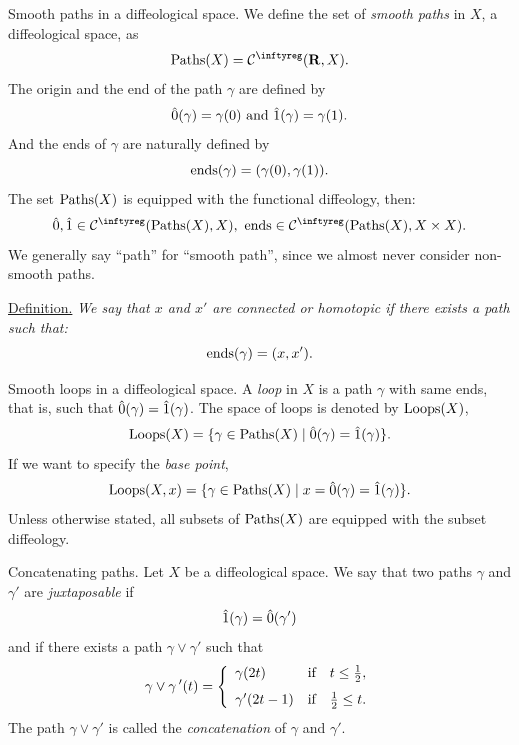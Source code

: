 \begin{Article}{Smooth paths in a diffeological space.}{}
  We define the set of \emph{smooth paths} in $X$,
  a diffeological space,
  as
  $$%
   \Paths(X) = \Cinfty(\RR,X).
  $$%
  The origin and the end of the path $\gamma$ are defined by
  $$%
  \0(\gamma) = \gamma(0)
  \SpacedText{and}
  \1(\gamma) = \gamma(1).
  $$%
  And the ends of $\gamma$ are naturally defined by
  $$%
  \Ends(\gamma) = (\gamma(0),\gamma(1)).
  $$%
  The set $\operatorname{Paths}(X)$ is equipped with the functional diffeology,
  then:
  $$%
  \0, \1 \in \Cinfty(\Paths(X), X),
  \ \Ends \in \Cinfty(\Paths(X), X \times X).
  $$%
  We generally say ``path'' for ``smooth path'',
  since we almost never consider non-smooth paths.

  \uline{Definition.} {\itshape We say that $x$ and $x'$ are \emph{connected} or \emph{homotopic} if there exists a path such that:
  $$%
  \Ends(\gamma) = (x,x').
  $$%
  }
\end{Article}

\begin{Article}{Smooth loops in a diffeological space.}{}
  A \emph{loop} in $X$ is a path $\gamma$ with same ends,
  that is,
  such that $\hat 0(\gamma) = \hat 1(\gamma)$.
  The space of loops is denoted by $\operatorname{Loops}(X)$,
  $$%
  \Loops(X) = \{ \gamma \in \Paths(X) \mid \0(\gamma) = \1(\gamma) \}.
  $$%
  If we want to specify the \emph{base point},
  $$%
  \Loops(X,x) = \{ \gamma \in \Paths(X) \mid x = \0(\gamma) = \1(\gamma) \}.
  $$%
  Unless otherwise stated,
  all subsets of $\operatorname{Paths}(X)$ are equipped with the subset diffeology.
\end{Article}

\begin{Article}{Concatenating paths.}{}
  \label{Concatenation-Paths}
  Let $X$ be a diffeological space.
  We say that two paths $\gamma$ and $\gamma'$ are \emph{juxtaposable} if
  $$%
  \1(\gamma) = \0(\gamma')
  $$%
  and if there exists a path $\gamma \vee \gamma'$ such that
  $$%
  \gamma\vee\gamma\,'(t) =
  \left\{
  \begin{array}{lcl}
    \gamma(2t) & \mbox{if} & t \leq {1 \over 2}, \\
    \vspace{-5pt} \\
    \gamma'(2t-1) &  \mbox{if} & {1 \over 2} \leq t.
  \end{array}
  \right.
  $$%
  The path $\gamma \vee \gamma'$ is called the \emph{concatenation} of $\gamma$ and $\gamma'$.
\end{Article}

